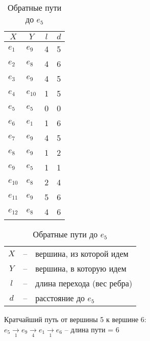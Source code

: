 \documentclass[a4paper,12pt]{article}
\begin{document}
\begin{table}[H]
    \centering
    \caption{Обратные пути до $e_5$}
    \begin{tabular}{l|l|c|c}
        \multicolumn{1}{c|}{$X$}&
        \multicolumn{1}{|c|}{$Y$}&
        $l$&$d$\\
        \hline
        $e_{1}$&$e_{9}$&4&5\\
        $e_{2}$&$e_{8}$&4&6\\
        $e_{3}$&$e_{9}$&4&5\\
        $e_{4}$&$e_{10}$&1&5\\
        $e_{5}$&$e_{5}$&0&0\\
        \hline
        $e_{6}$&$e_{1}$&1&6\\
        $e_{7}$&$e_{9}$&4&5\\
        $e_{8}$&$e_{9}$&1&2\\
        $e_{9}$&$e_{5}$&1&1\\
        \hline
        $e_{10}$&$e_{8}$&2&4\\
        $e_{11}$&$e_{9}$&5&6\\
        $e_{12}$&$e_{8}$&4&6\\
    \end{tabular}
    \begin{tabular}{ccl}
        $X$&--&вершина, из которой идем \\
        $Y$&--&вершина, в которую идем \\
        $l$&--&длина перехода (вес ребра) \\
        $d$&--&расстояние до $e_5$ \\
    \end{tabular}
\end{table}

\begin{table}[H]
    \noindent
    Кратчайший путь от вершины 5 к вершине 6: \\
    $e_{5}\xrightarrow[1]{} e_{9}\xrightarrow[4]{} e_{1}\xrightarrow[1]{} e_{6}$ -- длина пути = 6
\end{table}

\label{LastPage}
\end{document}
